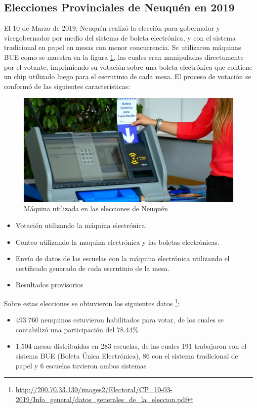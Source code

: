 \subsection{Elecciones Provinciales de Neuquén en 2019}
El 10 de Marzo de 2019, Neuquén realizó la elección para gobernador y vicegobernador por medio del sistema de boleta electrónica, y con el sistema tradicional en papel en mesas con menor concurrencia. Se utilizaron máquinas BUE como se muestra en la figura \ref{fig:maquinasBUE}, las cuales eran manipuladas directamente por el votante, imprimiendo su votación sobre una boleta electrónica que contiene un chip utilizado luego para el escrutinio de cada mesa. El proceso de votación se conformó de las siguientes características:
\begin{figure}
\begin{center}
  \includegraphics[scale=0.4]{img/Maquina_BUE.jpg}
  \caption{Máquina utilizada en las elecciones de Neuquén}
  \label{fig:maquinasBUE}
\end{center}
\end{figure}
\begin{itemize}
    \item Votación utilizando la máquina electrónica.
    \item Conteo utilizando la maquina electrónica y las boletas electrónicas.
    \item Envío de datos de las escuelas con la máquina electrónica utilizando el certificado generado de cada escrutinio de la mesa.
    \item Resultados provisorios
\end{itemize}

\newline Sobre estas elecciones se obtuvieron los siguientes datos \footnote{\url{http://200.70.33.130/images2/Electoral/CP_10-03-2019/Info\_general/datos\_generales\_de\_la\_eleccion.pdf}}:
\begin{itemize}
    \item 493.760 neuquinos estuvieron habilitados para votar, de los cuales se contabilizó una participación del 78.44\%
    \item 1.504 mesas distribuidas en 283 escuelas, de las cuales 191 trabajaron con el sistema BUE (Boleta Única Electrónica), 86 con el sistema tradicional de papel y 6 escuelas tuvieron ambos sistemas
\end{itemize}

